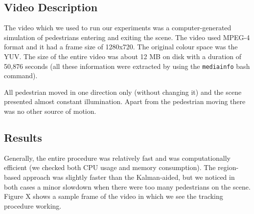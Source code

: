 \documentclass[runningheads]{llncs}
\begin{document}
\begin{table}[h]
\centering
\caption{Final parameters for the algorithm}
\label{table:params}
\end{table}

\subsection{Video Description}

The video which we used to run our experiments was a computer-generated simulation of pedestrians entering and exiting the scene. The video used MPEG-4 format and it had a frame size of 1280x720. The original colour space was the YUV.
The size of the entire video was about 12 MB on disk with a duration of 50,876 seconds (all these information were extracted by using the \texttt{mediainfo} bash command).

All pedestrian moved in one direction only (without changing it) and the scene presented almost constant illumination. Apart from the pedestrian moving there was no other source of motion. 

\subsection{Results}
Generally, the entire procedure was relatively fast and was computationally efficient (we checked both CPU usage and memory consumption). The region-based approach was slightly faster than the Kalman-aided, but we noticed in both cases a minor slowdown when there were too many pedestrians on the scene. Figure X shows a sample frame of the video in which we see the tracking procedure working.
\end{document}
